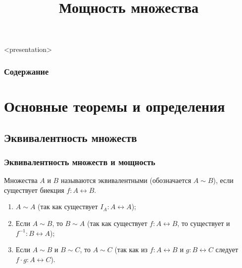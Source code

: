 


\title[Мощность множества]{Мощность множества}





\begin{frame}<presentation>
    \frametitle{Содержание}
    \tableofcontents
\end{frame}

\section{Основные теоремы и определения}


\subsection{Эквивалентность множеств}

\begin{frame}
    \frametitle{Эквивалентность множеств и мощность}
    
    \begin{definition}
        Множества $A$ и $B$ называются \alert{эквивалентными} (обозначается $A\sim B$), если существует биекция $f:A\leftrightarrow B$.
    \end{definition}

    \begin{enumerate}
        \item $A\sim A$ (так как существует $I_A:A\leftrightarrow A$);
        \item Если $A\sim B$, то $B\sim A$ (так как существует $f:A\leftrightarrow B$, то существует и $f^{-1}:B\leftrightarrow A$);
        \item Если $A\sim B$ и $B\sim C$, то $A\sim C$ (так как из $f:A\leftrightarrow B$ и $g:B\leftrightarrow C$ следует $f\cdot g:A\leftrightarrow C$).	
    \end{enumerate}
\end{frame}

